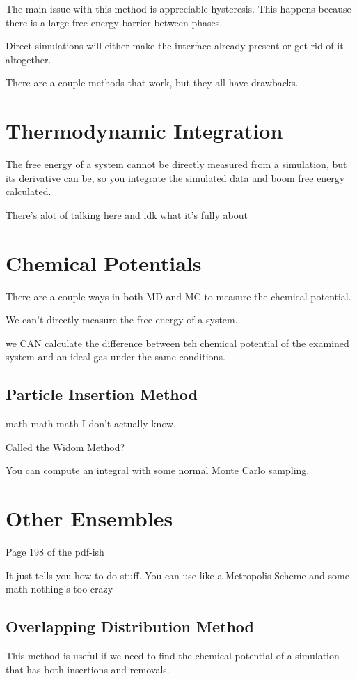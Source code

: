 \documentclass[fleqn]{report}
\begin{document}
The main issue with this method is appreciable hysteresis. This 
happens because there is a large free energy barrier between 
phases. 

Direct simulations will either make the interface already present 
or get rid of it altogether.

There are a couple methods that work, but they all have drawbacks.

\section{Thermodynamic Integration}
The free energy of a system cannot be directly measured from a simulation, but 
its derivative can be, so you integrate the simulated data and boom 
free energy calculated.  

There's alot of talking here and idk what it's fully about 

\section{Chemical Potentials}
There are a couple ways in both MD and MC to measure the chemical potential.

We can't directly measure the free energy of a system. 

we CAN calculate the difference between 
teh chemical potential of the examined system and an ideal gas under 
the same conditions. 

\subsection{Particle Insertion Method}
math math math I don't actually know.

Called the Widom Method?

You can compute an integral with some normal Monte Carlo sampling.

\section{Other Ensembles}
Page 198 of the pdf-ish

It just tells you how to do stuff. You can use like a Metropolis Scheme 
and some math nothing's too crazy 

\subsection{Overlapping Distribution Method}
This method is useful if we need to find the chemical potential 
of a simulation that has both insertions and removals. 
\end{document}
